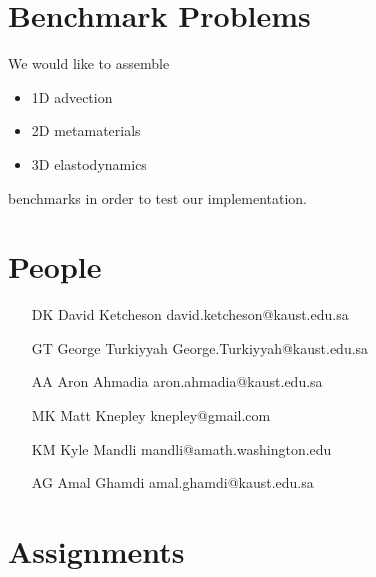 \documentclass[12pt]{article}
\begin{document}
\section{Benchmark Problems}

We would like to assemble
\begin{itemize}
  \item 1D advection

  \item 2D metamaterials

  \item 3D elastodynamics
\end{itemize}
benchmarks in order to test our implementation.

\section{People}
\begin{itemize}
  \item[DK] David Ketcheson david.ketcheson@kaust.edu.sa
  \item[GT] George Turkiyyah George.Turkiyyah@kaust.edu.sa
  \item[AA] Aron Ahmadia aron.ahmadia@kaust.edu.sa
  \item[MK] Matt Knepley knepley@gmail.com
  \item[KM] Kyle Mandli mandli@amath.washington.edu 
  \item[AG] Amal Ghamdi amal.ghamdi@kaust.edu.sa
\end{itemize}

\section{Assignments}
\end{document}
